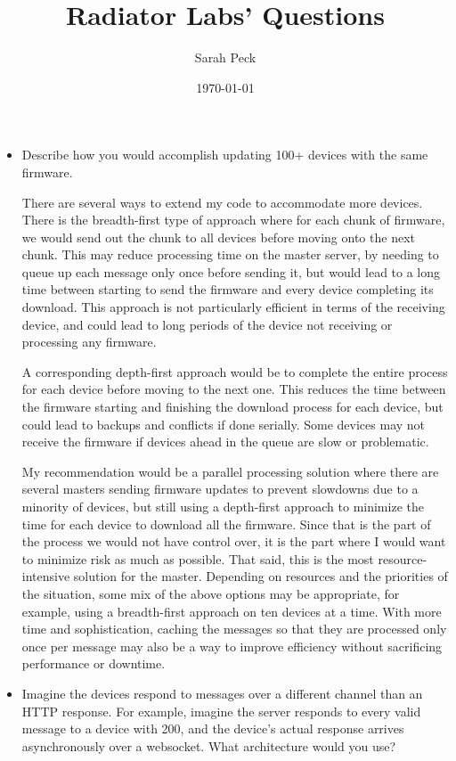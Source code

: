 \documentclass{article}
\begin{document}
	\author{Sarah Peck}
	\date{\today}
	\title{Radiator Labs' Questions}
	\maketitle
	
	\begin{itemize}
		\item Describe how you would accomplish updating 100+ devices with the same firmware.
		
		There are several ways to extend my code to accommodate more devices. There is the breadth-first type of approach where for each chunk of firmware, we would send out the chunk to all devices before moving onto the next chunk. This may reduce processing time on the master server, by needing to queue up each message only once before sending it, but would lead to a long time between starting to send the firmware and every device completing its download. This approach is not particularly efficient in terms of the receiving device, and could lead to long periods of the device not receiving or processing any firmware. 
		
		A corresponding depth-first approach would be to complete the entire process for each device before moving to the next one. This reduces the time between the firmware starting and finishing the download process for each device, but could lead to backups and conflicts if done serially. Some devices may not receive the firmware if devices ahead in the queue are slow or problematic.
		
		My recommendation would be a parallel processing solution where there are several masters sending firmware updates to prevent slowdowns due to a minority of devices, but still using a depth-first approach to minimize the time for each device to download all the firmware. Since that is the part of the process we would not have control over, it is the part where I would want to minimize risk as much as possible. That said, this is the most resource-intensive solution for the master. Depending on resources and the priorities of the situation, some mix of the above options may be appropriate, for example, using a breadth-first approach on ten devices at a time. With more time and sophistication, caching the messages so that they are processed only once per message may also be a way to improve efficiency without sacrificing performance or downtime.
		
		\item Imagine the devices respond to messages over a different channel than
		an HTTP response. For example, imagine the server responds to every
		valid message to a device with 200, and the device’s actual response
		arrives asynchronously over a websocket. What architecture would you
		use?
		

\end{itemize}
\end{document}
